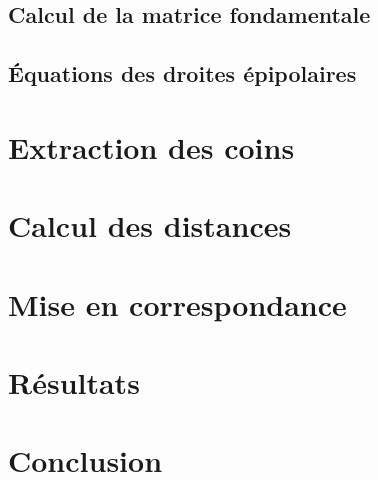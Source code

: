 \documentclass[a4paper]{article}
\begin{document}
\subsection{Calcul de la matrice fondamentale}

\subsection{Équations des droites épipolaires}

\clearpage

\section{Extraction des coins}


\clearpage

\section{Calcul des distances}


\clearpage

\section{Mise en correspondance}


\clearpage

\section{Résultats}

\clearpage


\section{Conclusion}

\clearpage
\end{document}
